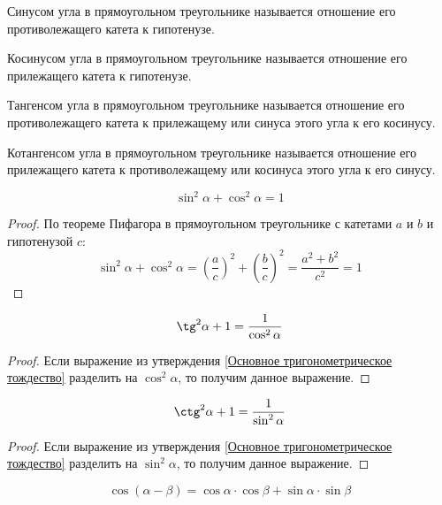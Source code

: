 \documentclass[12pt]{article}
\begin{document}
\begin{definition}
    Синусом угла в прямоугольном треугольнике называется отношение его противолежащего катета к гипотенузе.
\end{definition}
\begin{definition}
    Косинусом угла в прямоугольном треугольнике называется отношение его прилежащего катета к гипотенузе.
\end{definition}
\begin{definition}
    Тангенсом угла в прямоугольном треугольнике называется отношение его противолежащего катета к прилежащему или синуса этого угла к его косинусу.
\end{definition}
\begin{definition}
    Котангенсом угла в прямоугольном треугольнике называется отношение его прилежащего катета к противолежащему или косинуса этого угла к его синусу.
\end{definition}
\begin{statement}\label{Основное тригонометрическое тождество}
    $$\sin^2 \alpha + \cos^2 \alpha=1$$
\end{statement}
\begin{proof}
    По теореме Пифагора в прямоугольном треугольнике с катетами $a$ и $b$ и гипотенузой $c$:
    $$\sin^2 \alpha + \cos^2 \alpha=\left(\dfrac{a}{c}\right)^2+\left(\dfrac{b}{c}\right)^2=\dfrac{a^2 + b^2}{c^2}=1$$
\end{proof}
\begin{statement}
    $$\tg^2\alpha + 1=\dfrac{1}{\cos^2 \alpha}$$
\end{statement}
\begin{proof}
    Если выражение из утверждения \ref{Основное тригонометрическое тождество} разделить на $\cos^2 \alpha$, то получим данное выражение.
\end{proof}
\begin{statement}
    $$\ctg^2\alpha + 1=\dfrac{1}{\sin^2 \alpha}$$
\end{statement}
\begin{proof}
    Если выражение из утверждения \ref{Основное тригонометрическое тождество} разделить на $\sin^2 \alpha$, то получим данное выражение.
\end{proof}
\begin{statement}
    $$\cos(\alpha - \beta)=\cos\alpha\cdot\cos\beta+\sin\alpha\cdot\sin\beta$$
\end{statement}
\end{document}
